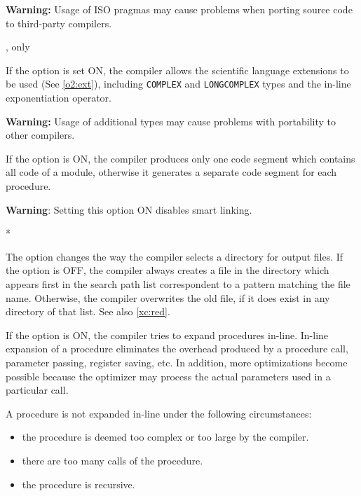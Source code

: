 \begin{description}
        {\bf Warning:} Usage of ISO \mt{} pragmas may cause problems
        when porting source code to third-party \ot{} compilers.

        \MLBegin{}\ModeC{},\ot{} only\MLEnd{} \header

        If the option is set ON, the compiler allows the \ot{}
        scientific language extensions to be used (See \ref{o2:ext}),
        including {\tt COMPLEX} and {\tt LONGCOMPLEX} types and the
        in-line exponentiation operator.

        {\bf Warning:}  Usage of additional types may cause
        problems with portability to other compilers.

\ifgencode
{}
        \MLBegin{}\ModeC{}\MLEnd{}

        If the option is ON, the compiler produces only one code
        segment which contains all code of a module, otherwise it generates
        a separate code segment for each procedure.

        {\bf Warning}: Setting this option ON disables smart linking.
\fi

        \MLBegin{}*\MLEnd{}

        The option changes the way the compiler selects a directory
        for output files. If the option is OFF,
        the compiler always creates a file in the directory
        which  appears  first  in  the  search  path list
        correspondent to a pattern matching the file name.
        Otherwise, the compiler overwrites the old file,
        if it does exist in any directory of that list.
        See also \ref{xc:red}.

        \MLBegin{}\ModeC{}\MLEnd{}

        If the option is ON, the compiler tries to expand procedures
        in-line. In-line expansion of a procedure eliminates the overhead
        produced by a procedure call, parameter passing, register saving,
        etc. In addition, more optimizations become possible because
        the optimizer may process the actual parameters used in a particular
        call.

        A procedure is not expanded in-line under the following
        circumstances:
        \begin{itemize}
        \item the procedure is deemed too complex or too large by the
              compiler.
        \item there are too many calls of the procedure.
        \item the procedure is recursive.
        \end{itemize}


\end{description}
